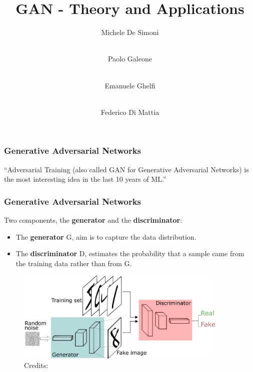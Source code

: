 \documentclass{beamer}
\title[GAN] %
{GAN - Theory and Applications}
\author %
{Michele De Simoni  \and  \\ Paolo Galeone \and \\ Emanuele Ghelfi \and \\ Federico Di Mattia}
\begin{document}
 
{
  \begin{frame}
    \titlepage
  \end{frame}
}

 
\begin{frame}
\frametitle{Generative Adversarial Networks}

\begin{block}{}
	{\large ``Adversarial Training (also called GAN for Generative Adversarial Networks) is the most interesting idea in the last 10 years of ML.''}
	\vskip5mm
	\hspace*{}
\end{block}

\end{frame}

\begin{frame}
\frametitle{Generative Adversarial Networks}
	Two components, the \textbf{generator} and the \textbf{discriminator}:
	\begin{itemize}
		\item The \textbf{generator} G, aim is to capture the data distribution.
		\item The \textbf{discriminator} D, estimates the probability that a sample came from the training data rather than from G.
	\end{itemize}

\begin{figure}
	\includegraphics[width=0.9\textwidth]{images/GANs.png}
	\caption{Credits: \cite{silvaIntuitiveIntroductionGenerative2018}  }
\end{figure}

\end{frame}
\end{document}
